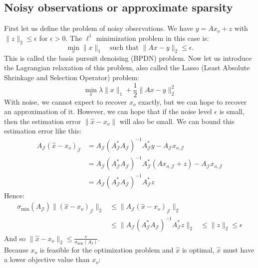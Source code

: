 \documentclass[12pt, openany]{report}
\theoremstyle{definition}
\begin{document}
\subsection{Noisy observations or approximate sparsity}
First let us define the problem of noisy observations. We have $y = Ax_o + z$ with $\|z\|_2 \leq \epsilon$ for $\epsilon > 0$. The $\ell^1$ minimization problem in this case is:
\begin{equation}
	\min_{x} \|x\|_1 \quad \text{such that } \|Ax - y\|_2 \leq \epsilon.
\end{equation}
This is called the basis pursuit denoising (BPDN) problem. Now let us introduce the Lagrangian relaxation of this problem, also called the Lasso (Least Absolute Shrinkage and Selection Operator) problem:
\begin{equation}
	\min_x \lambda \|x\|_1 + \frac{1}{2}\|Ax - y\|_2^2 
\end{equation}
With noise, we cannot expect to recover $x_o$ exactly, but we can hope to recover an approximation of it. However, we can hope that if the noise level $\epsilon$ is small, then the estimation error $\|\hat{x}-x_o\|$ will also be small. We can bound this estimation error like this:
\begin{equation}
	\begin{aligned}
		A_\mathcal{J}(\hat{x} - x_o)_\mathcal{J} &= A_\mathcal{J} (A_\mathcal{J}^* A_\mathcal{J})^{-1} A_\mathcal{J}^* y - A_\mathcal{J} x_{o,\mathcal{J}}\\
		&= A_\mathcal{J} (A_\mathcal{J}^* A_\mathcal{J})^{-1} A_\mathcal{J}^* (Ax_{o,\mathcal{J}} + z) - A_\mathcal{J} x_{o,\mathcal{J}}\\
		&= A_\mathcal{J} (A_\mathcal{J}^* A_\mathcal{J})^{-1} A_\mathcal{J}^* z
	\end{aligned}
\end{equation}
Hence:
\begin{equation}
	\begin{aligned}
		\sigma_{\min}(A_\mathcal{J}) \|(\hat{x} - x_o)_\mathcal{J}\|_2 &\leq \|A_\mathcal{J} (\hat{x} - x_o)_\mathcal{J}\|_2\\
		&\leq \| A_\mathcal{J} (A_\mathcal{J}^* A_\mathcal{J})^{-1} A_\mathcal{J}^* z\|_2
		&\leq \|z\|_2 \leq \epsilon
	\end{aligned}
\end{equation}
And so $\|\hat{x} - x_o\|_2 \leq \frac{\epsilon}{\sigma_{\min}(A_I)}$.\\
Because $x_o$ is feasible for the optimization problem and $\hat{x}$ is optimal, $\hat{x}$ must have a lower objective value than $x_o$:
\end{document}
